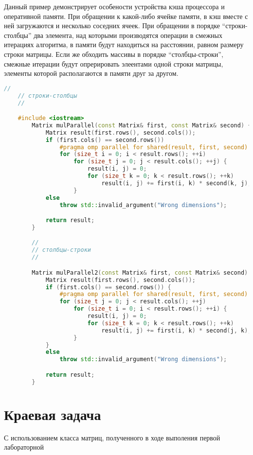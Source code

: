 \documentclass{article}
\begin{document}
	Данный пример демонстрирует особености устройства кэша процессора и оперативной памяти. При обращении к какой-либо ячейке памяти, в кэш вместе с ней загружаются и несколько соседних ячеек. При обращении в порядке ``строки-столбцы'' два элемента, над которыми производятся операции в смежных итерациях алгоритма, в памяти будут находиться на расстоянии, равном размеру строки матрицы. Если же обходить массивы в порядке ``столбцы-строки'', смежные итерации будут опрерировать элеентами одной строки матрицы, элементы которой располагаются в памяти друг за другом.
	
	\begin{lstlisting}[language=C++, caption={Два способа обхода матрицы}, label={lst:matrixLookup}, texcl=true]
	//
	// строки-столбцы
	//

	#include <iostream>
		Matrix mulParallel(const Matrix& first, const Matrix& second) {
			Matrix result(first.rows(), second.cols());
			if (first.cols() == second.rows())
				#pragma omp parallel for shared(result, first, second)
				for (size_t i = 0; i < result.rows(); ++i) 
					for (size_t j = 0; j < result.cols(); ++j) {
						result(i, j) = 0;
						for (size_t k = 0; k < result.rows(); ++k) 
							result(i, j) += first(i, k) * second(k, j);
					}
			else
				throw std::invalid_argument("Wrong dimensions");

			return result;
		}

		//
		// столбцы-строки
		//

		Matrix mulParallel2(const Matrix& first, const Matrix& second) {
			Matrix result(first.rows(), second.cols());
			if (first.cols() == second.rows()) {
				#pragma omp parallel for shared(result, first, second)
				for (size_t j = 0; j < result.cols(); ++j) 
					for (size_t i = 0; i < result.rows(); ++i) {
						result(i, j) = 0;
						for (size_t k = 0; k < result.rows(); ++k) 
							result(i, j) += first(i, k) * second(j, k);
					}
			}
			else
				throw std::invalid_argument("Wrong dimensions");

			return result;
		}

	\end{lstlisting}
	\section{Краевая задача}\label{sec:lab2}
	С использованием класса матриц, полученного в ходе выполения первой лабораторной
\end{document}
